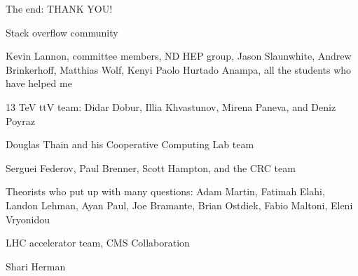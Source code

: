 \documentclass[professionalfont,fleqn]{beamer}
\begin{document}
\begin{frame}{The end: THANK YOU!}
  \begin{center}
    \footnotesize
    Stack overflow community

    Kevin Lannon, committee members, ND HEP group, Jason Slaunwhite, Andrew Brinkerhoff, Matthias Wolf, Kenyi Paolo Hurtado Anampa, all the students who have helped me

    13 TeV ttV team: Didar Dobur, Illia Khvastunov, Mirena Paneva, and Deniz Poyraz

    Douglas Thain and his Cooperative Computing Lab team

    Serguei Federov, Paul Brenner, Scott Hampton, and the CRC team

    Theorists who put up with many questions: Adam Martin, Fatimah Elahi, Landon Lehman, Ayan Paul, Joe Bramante, Brian Ostdiek, Fabio Maltoni, Eleni Vryonidou

    LHC accelerator team, CMS Collaboration

    Shari Herman
  \end{center}
\end{frame}


\end{document}
